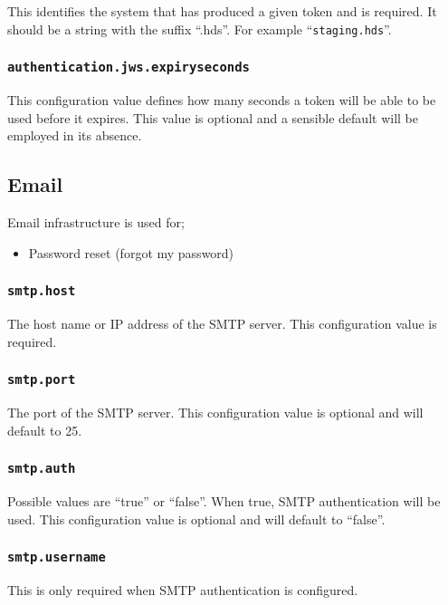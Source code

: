 This identifies the system that has produced a given token and is required.  It should be a string with the suffix ``.hds''.  For example ``{\tt staging.hds}''.

\subsubsection{\tt authentication.jws.expiryseconds}

This configuration value defines how many seconds a token will be able to be used before it expires.  This value is optional and a sensible default will be employed in its absence.

\subsection{Email}

Email infrastructure is used for;

\begin{itemize}
\item Password reset (forgot my password)
\end{itemize}

\subsubsection{\tt smtp.host}

The host name or IP address of the SMTP server.  This configuration value is required.

\subsubsection{\tt smtp.port}

The port of the SMTP server.  This configuration value is optional and will default to 25.

\subsubsection{\tt smtp.auth}

Possible values are ``true'' or ``false''.  When true, SMTP authentication will be used.  This configuration value is optional and will default to ``false''.

\subsubsection{\tt smtp.username}

This is only required when SMTP authentication is configured.

